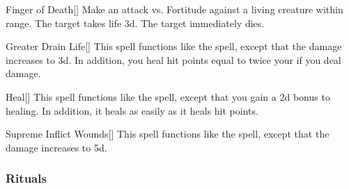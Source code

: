 \lowercase{\hypertarget{spell:Finger of Death}{}}\label{spell:Finger of Death}
\begin{freeability}[\nth{5}]{\hypertarget{spell:Finger of Death}{Finger of Death}}[]
Make an attack vs. Fortitude against a living creature within \rngclose range.
\hit The target takes life  \plus3d.
\crit The target immediately dies.
\end{freeability}
\vspace{0.25em}



\lowercase{\hypertarget{spell:Greater Drain Life}{}}\label{spell:Greater Drain Life}
\begin{freeability}[\nth{5}]{\hypertarget{spell:Greater Drain Life}{Greater Drain Life}}[]
This spell functions like the  spell, except that the damage increases to  \plus3d.
In addition, you heal hit points equal to twice your  if you deal damage.
\end{freeability}
\vspace{0.25em}



\lowercase{\hypertarget{spell:Heal}{}}\label{spell:Heal}
\begin{freeability}[\nth{5}]{\hypertarget{spell:Heal}{Heal}}[]
This spell functions like the  spell, except that you gain a \plus2d bonus to healing.
In addition, it heals  as easily as it heals hit points.
\end{freeability}
\vspace{0.25em}



\lowercase{\hypertarget{spell:Supreme Inflict Wounds}{}}\label{spell:Supreme Inflict Wounds}
\begin{freeability}[\nth{7}]{\hypertarget{spell:Supreme Inflict Wounds}{Supreme Inflict Wounds}}[]
This spell functions like the  spell, except that the damage increases to  \plus5d.
\end{freeability}
\vspace{0.25em}



\subsubsection{Rituals}


